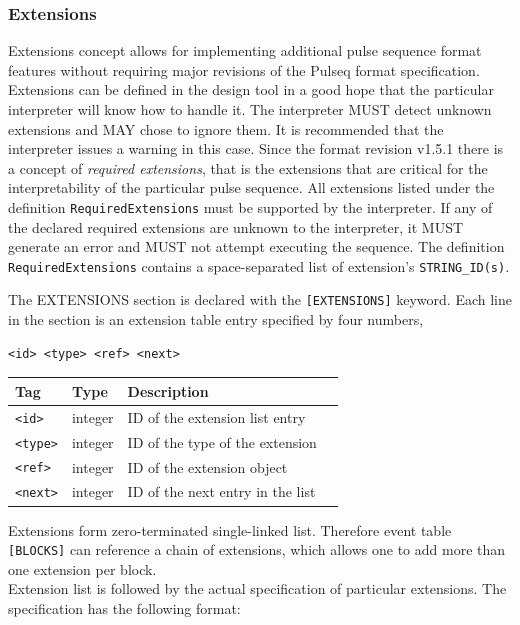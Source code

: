\documentclass{article}
\begin{document}
\subsubsection{Extensions}
Extensions concept allows for implementing additional pulse sequence format features without requiring major revisions of the Pulseq format specification. Extensions can be defined in the design tool in a good hope that the particular interpreter will know how to handle it. The interpreter MUST detect unknown extensions and MAY chose to ignore them. It is recommended that the interpreter issues a warning in this case. Since the format revision v1.5.1 there is a concept of \textit{required extensions}, that is the extensions that are critical for the interpretability of the particular pulse sequence. All extensions listed under the definition \verb.RequiredExtensions. must be supported by the interpreter. If any of the declared required extensions are unknown to the interpreter, it MUST generate an error and MUST not attempt executing the sequence. The definition \verb.RequiredExtensions. contains a space-separated list  of extension's \verb.STRING_ID(s)..

The EXTENSIONS section is declared with the \verb.[EXTENSIONS]. keyword. Each line in the section is an extension table entry specified by four numbers,
\begin{lstlisting}
<id> <type> <ref> <next>
\end{lstlisting}

\begin{tabularx}{\textwidth}{llXl}
\toprule
Tag & Type & Description \\
\midrule
\verb.<id>. & integer & ID of the extension list entry \\
\verb.<type>. & integer & ID of the type of the extension \\
\verb.<ref>. & integer & ID of the extension object \\
\verb.<next>. & integer & ID of the next entry in the list \\
\bottomrule
\end{tabularx}

Extensions form zero-terminated single-linked list. Therefore event table \verb.[BLOCKS]. can reference a chain of extensions, which allows one to add more than one extension per block. \\

Extension list is followed by the actual specification of particular extensions. The specification has the following format:
\end{document}
